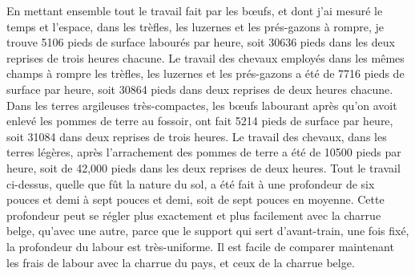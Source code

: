 En mettant ensemble tout le travail fait par les bœufs, et dont j'ai mesuré le temps et l'espace, dans les trèfles, les luzernes et les prés-gazons à rompre, je trouve 5106 pieds de surface labourés par heure, soit 30636 pieds dans les deux reprises de trois heures chacune.
Le travail des chevaux employés dans les mêmes champs à rompre les trèfles, les luzernes et les prés-gazons a été de 7716 pieds de surface par heure, soit 30864 pieds dans deux reprises de deux heures chacune.
Dans les terres argileuses très-compactes, les bœufs labourant après qu'on avoit enlevé les pommes de terre au fossoir, ont\setcounter{page}{397} fait 5214 pieds de surface par heure, soit 31084 dans deux reprises de trois heures.
Le travail des chevaux, dans les terres légères, après l'arrachement des pommes de terre a été de 10500 pieds par heure, soit de 42,000 pieds dans les deux reprises de deux heures.
Tout le travail ci-dessus, quelle que fût la nature du sol, a été fait à une profondeur de six pouces et demi à sept pouces et demi, soit de sept pouces en moyenne. Cette profondeur peut se régler plus exactement et plus facilement avec la charrue belge, qu'avec une autre, parce que le support qui sert d'avant-train, une fois fixé, la profondeur du labour est très-uniforme.
Il est facile de comparer maintenant les frais de labour avec la charrue du pays, et ceux de la charrue belge.
